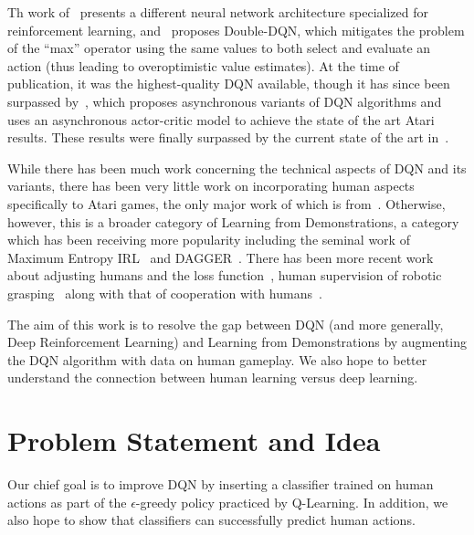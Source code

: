\documentclass[letterpaper, 10pt, conference]{ieeeconf}
\begin{document}
Th work of~\cite{DBLP:conf/icml/WangSHHLF16} presents a different neural network
architecture specialized for reinforcement learning,
and~\cite{DBLP:conf/aaai/HasseltGS16} proposes Double-DQN, which mitigates
the problem of the ``max'' operator using the same values to both select and
evaluate an action (thus leading to overoptimistic value estimates). At the time
of publication, it was the highest-quality DQN available, though it has since
been surpassed by~\cite{DBLP:conf/icml/MnihBMGLHSK16}, which proposes
asynchronous variants of DQN algorithms and uses an asynchronous actor-critic
model to achieve the state of the art Atari results. These results were finally
surpassed by the current state of the art
in~\cite{DBLP:journals/corr/JaderbergMCSLSK16}.

While there has been much work concerning the technical aspects of DQN and its
variants, there has been very little work on incorporating human aspects
specifically to Atari games, the only major work of which is
from~\cite{DBLP:journals/corr/HosuR16}. Otherwise, however, this is a broader
category of Learning from Demonstrations, a category which has been receiving
more popularity including the seminal work of Maximum Entropy
IRL~\cite{Ziebart_2008_6055} and DAGGER~\cite{DBLP:journals/jmlr/RossGB11}.
There has been more recent work about adjusting humans and the loss
function~\cite{conf/nips/KimFPP13}, human supervision of robotic
grasping~\cite{DBLP:journals/corr/LaskeyCLMKJDG16,DBLP:dblp_conf/icra/LaskeySHMPDG16}
along with that of cooperation with humans~\cite{NIPS2016_6420}.

The aim of this work is to resolve the gap between DQN (and more generally, Deep
Reinforcement Learning) and Learning from Demonstrations by augmenting the DQN
algorithm with data on human gameplay. We also hope to better understand the
connection between human learning versus deep learning.



\section{Problem Statement and Idea}\label{sec:idea}

Our chief goal is to improve DQN by inserting a classifier trained on human
actions as part of the $\epsilon$-greedy policy practiced by Q-Learning. In
addition, we also hope to show that classifiers can successfully predict human
actions.
\end{document}
